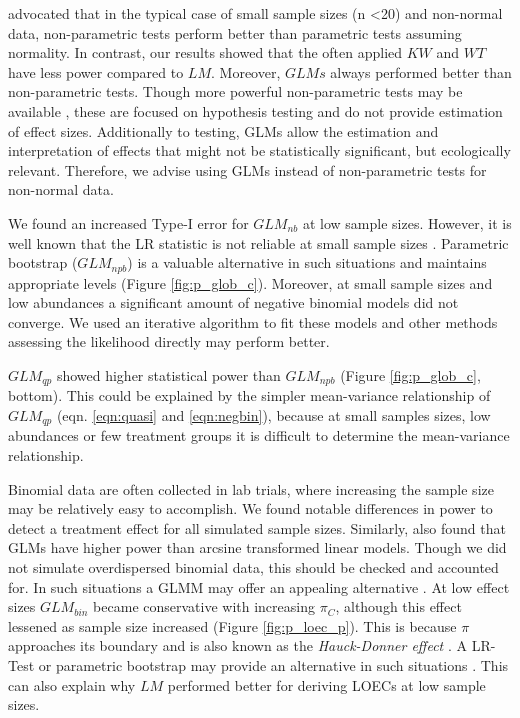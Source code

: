 \documentclass[twocolumn, natbib]{svjour3}
\begin{document}
\citet{wang_making_2011} advocated that in the typical case of small sample sizes (n \textless 20) and non-normal data, non-parametric tests perform better than parametric tests assuming normality.
In contrast, our results showed that the often applied $KW$ and $WT$ have less power compared to $LM$.
Moreover, $GLMs$ always performed better than non-parametric tests. 
Though more powerful non-parametric tests may be available \citep{konietschke_rank-based_2012}, these are focused on hypothesis testing and do not provide estimation of effect sizes.
Additionally to testing, GLMs allow the estimation and interpretation of effects that might not be statistically significant, but ecologically relevant.
Therefore, we advise using GLMs instead of non-parametric tests for non-normal data.

We found an increased Type-I error for $GLM_{nb}$ at low sample sizes.
However, it is well known that the LR statistic is not reliable at small sample sizes \citep{bolker_generalized_2009,wilks_large-sample_1938}.
Parametric bootstrap ($GLM_{npb}$) is a valuable alternative in such situations and maintains appropriate levels (Figure \ref{fig:p_glob_c}).
Moreover, at small sample sizes and low abundances a significant amount of negative binomial models did not converge.
We used an iterative algorithm to fit these models \citep{venables_modern_2002} and other methods assessing the likelihood directly may perform better.

$GLM_{qp}$ showed higher statistical power than $GLM_{npb}$ (Figure \ref{fig:p_glob_c}, bottom).
This could be explained by the simpler mean-variance relationship of $GLM_{qp}$ (eqn. \ref{eqn:quasi} and \ref{eqn:negbin}), because at small samples sizes, low abundances or few treatment groups it is difficult to determine the mean-variance relationship.

Binomial data are often collected in lab trials, where increasing the sample size may be relatively easy to accomplish. 
We found notable differences in power to detect a treatment effect for all simulated sample sizes.
Similarly, \citet{warton_arcsine_2011} also found that GLMs have higher power than arcsine transformed linear models.
Though we did not simulate overdispersed binomial data, this should be checked and accounted for.
In such situations a GLMM may offer an appealing alternative \citep{warton_arcsine_2011}.
At low effect sizes $GLM_{bin}$ became conservative with increasing $\pi_C$, although this effect lessened as sample size increased (Figure \ref{fig:p_loec_p}). 
This is because $\pi$ approaches its boundary and is also known as the \emph{Hauck-Donner effect} \citep{hauck_walds_1977}. A LR-Test or parametric bootstrap may provide an alternative in such situations \citep{bolker_generalized_2009}.
This can also explain why $LM$ performed better for deriving LOECs at low sample sizes.
\end{document}
